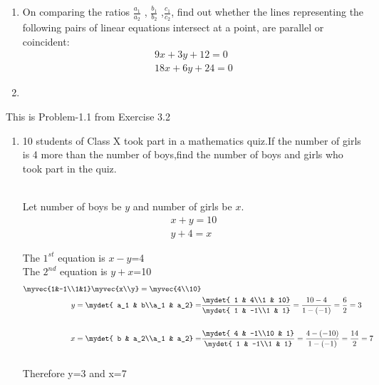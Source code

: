 %
%
\renewcommand{\theequation}{\theenumi}
\begin{enumerate}[label=\thechapter.\arabic*.,ref=\thechapter.\theenumi]
\item On comparing the ratios $\frac{a_1}{a_2}$ , $\frac{b_1}{b_2}$ ,$\frac{c_1}{c_2}$, find out whether the lines representing the following pairs of linear equations intersect at a point, are parallel or coincident:\\
\begin{align}
9x+3y+12=0\\
18x+6y+24=0
\end{align}
\item
\end{enumerate}
This is Problem-1.1 from Exercise 3.2
\begin{enumerate}
\item 10 students of Class X took part in a mathematics quiz.If the number of girls is 4 more than the number of boys,find the number of boys and girls who took part in the quiz.
	
\solution \\
Let number of boys be $y$ and number of girls be $x$.\\
\begin{align}
x+y=10\\
y+4=x
\end{align}

The $1^{st}$ equation is $x-y$=4\\
The $2^{nd}$ equation is $y+x$=10\\
\begin{align}
\myvec{1&-1\\1&1} \myvec{x\\y}=\myvec{4\\10}\\
y=\mydet{ a_1 & b\\a_1 & a_2} =&
\frac{\mydet{ 1 & 4\\1 & 10}}{\mydet{ 1 & -1\\1 & 1}}
=\frac{10-4}{1-(-1)}
=\frac{6}{2}
=3 \\ \\
x=\mydet{ b & a_2\\a_1 & a_2} =&
\frac{\mydet{ 4 & -1\\10 & 1}}{\mydet{ 1 & -1\\1 & 1}}
=\frac{4-(-10)}{1-(-1)}
=\frac{14}{2}
=7\\ \\
\end{align}
Therefore  y=3 and x=7
\end{enumerate}
